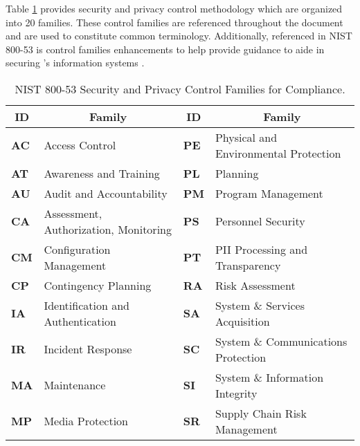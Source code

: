 Table \ref{tab:nistteighthundredff} provides security and privacy control methodology which are organized into 20 families. These control families are referenced throughout the document and are used to constitute common terminology. Additionally, referenced in NIST 800-53 is control families enhancements to help provide guidance to aide in securing \cptc's information systems \cite{nist80053}.


\begin{table}[h]
\centering
\caption{NIST 800-53 Security and Privacy Control Families for Compliance.}
\label{tab:nistteighthundredff}
\begin{tabular}{|l|p{16em}|l|p{16em}|}
\hline
\multicolumn{1}{|c|}{\textbf{ID}} & \multicolumn{1}{c|}{\textbf{Family}} & \multicolumn{1}{c|}{\textbf{ID}} & \multicolumn{1}{c|}{\textbf{Family}} \\ \hline
{\textbf{AC}} & Access Control                            & {\textbf{PE}} & Physical and Environmental Protection \\ \hline
{\textbf{AT}} & Awareness and Training                    & {\textbf{PL}} & Planning                              \\ \hline
{\textbf{AU}} & Audit and Accountability                  & {\textbf{PM}} & Program Management                    \\ \hline
{\textbf{CA}} & Assessment, Authorization, Monitoring     & {\textbf{PS}} & Personnel Security                    \\ \hline
{\textbf{CM}} & Configuration Management                  & {\textbf{PT}} & PII Processing and Transparency       \\ \hline
{\textbf{CP}} & Contingency Planning                      & {\textbf{RA}} & Risk Assessment                       \\ \hline
{\textbf{IA}} & Identification and Authentication         & {\textbf{SA}} & System \& Services Acquisition        \\ \hline
{\textbf{IR}} & Incident Response                         & {\textbf{SC}} & System \& Communications Protection   \\ \hline
{\textbf{MA}} & Maintenance                               & {\textbf{SI}} & System \& Information Integrity       \\ \hline
{\textbf{MP}} & Media Protection                          & {\textbf{SR}} & Supply Chain Risk Management          \\ \hline
\end{tabular}
\end{table}
